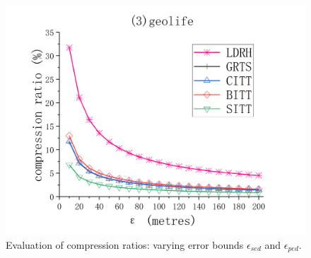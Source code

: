 {\begin{figure}[tb!]
	\includegraphics[scale = 0.555]{figures/Fig-geolife-compression-ratio.png}\hspace{0ex}
	\vspace{-2ex}
	\caption{\small Evaluation of compression ratios: varying error bounds $\epsilon_{sed}$ and $\epsilon_{ped}$.}
	\label{fig:compression-ratio}
	\vspace{-1ex}
\end{figure}



}
